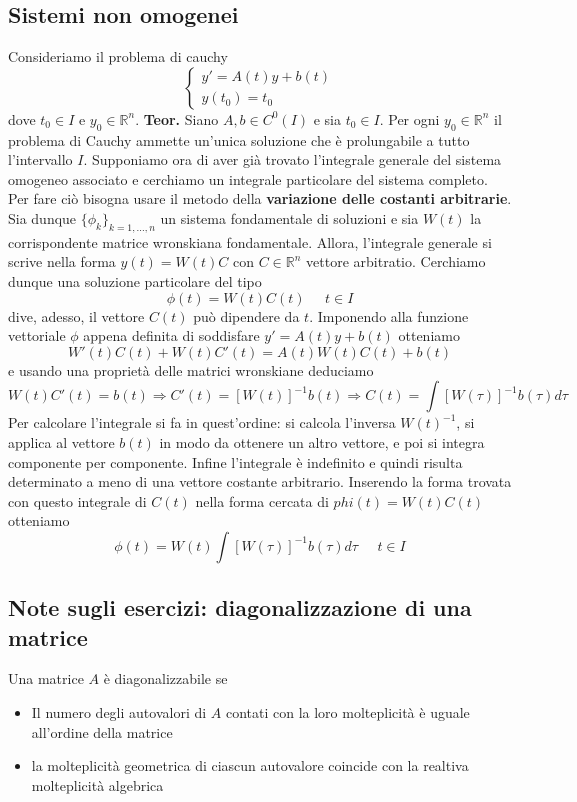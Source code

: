 \subsection{Sistemi non omogenei}
Consideriamo il problema di cauchy
\[
    \begin{cases}
        y' = A(t) y + b(t)\\
        y(t_0) = t_0
    \end{cases}
\]
dove $t_0 \in I$ e $y_0 \in \mathbb{R}^n$.\newline
\newline
\textbf{Teor.} Siano $A,b \in C^0 (I)$ e sia $t_0 \in I$. Per ogni $y_0 \in \mathbb{R}^n$ il problema di Cauchy ammette un'unica soluzione che è prolungabile a tutto l'intervallo $I$.\newline
\newline
Supponiamo ora di aver già trovato l'integrale generale del sistema omogeneo associato e cerchiamo un integrale particolare del sistema completo. Per fare ciò bisogna usare il metodo della \textbf{variazione delle costanti arbitrarie}. Sia dunque $\{ \phi_k\}_{k = 1, \dots, n}$ un sistema fondamentale di soluzioni e sia $W(t)$ la corrispondente matrice wronskiana fondamentale. Allora, l'integrale generale si scrive nella forma $y(t) = W(t) C$ con $C \in \mathbb{R}^n$ vettore arbitratio. Cerchiamo dunque una soluzione particolare del tipo
\[
    \phi(t) = W(t) C(t) \;\;\;\;\;t \in I
\]
dive, adesso, il vettore $C(t)$ può dipendere da $t$. Imponendo alla funzione vettoriale $\phi$ appena definita di soddisfare $y' = A(t) y + b(t)$ otteniamo 
\[
    W'(t) C(t) + W(t) C'(t) = A(t) W(t)C(t) + b(t)
\]
e usando una proprietà delle matrici wronskiane deduciamo
\[
    W(t) C'(t) = b(t) \Longrightarrow C'(t) = [W(t)]^{-1} b(t) \Longrightarrow C(t) = \int [W(\tau)]^{-1} b(\tau) d \tau
\]
Per calcolare l'integrale si fa in quest'ordine: si calcola l'inversa $W(t)^{-1}$, si applica al vettore $b(t)$ in modo da ottenere un altro vettore, e poi si integra componente per componente. Infine l'integrale è indefinito e quindi risulta determinato a meno di una vettore costante arbitrario.\newline
Inserendo la forma trovata con questo integrale di $C(t)$ nella forma cercata di $phi(t)= W(t) C(t)$ otteniamo
\[
    \phi(t) = W(t) \int[W(\tau)]^{-1} b (\tau) d \tau \;\;\;\;\; t \in I
\]
\subsection{Note sugli esercizi: diagonalizzazione di una matrice}
Una matrice $A$ è diagonalizzabile se
\begin{itemize}
    \item Il numero degli autovalori di $A$ contati con la loro molteplicità è uguale all'ordine della matrice
    \item la molteplicità geometrica di ciascun autovalore coincide  con la realtiva molteplicità algebrica
\end{itemize}

